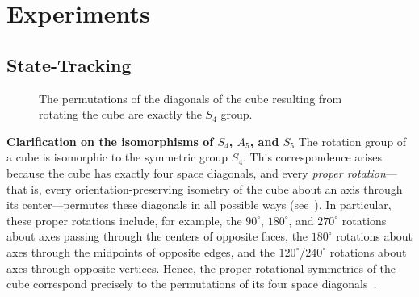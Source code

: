 \documentclass{article} %
\begin{document}
\section{Experiments}


\subsection{State-Tracking}\label{app:state_tracking}

\begin{wrapfigure}[15]{r}{0.2\linewidth}
\vspace{0mm}
  \centering
  \vspace{-7 mm}
  \caption{The permutations of the diagonals of the cube resulting from rotating the cube are exactly the $S_4$ group.}
  \label{fig:cube}
\end{wrapfigure}
\textbf{Clarification on the isomorphisms of $S_4$, $A_5$, and $S_5$}
The rotation group of a cube is isomorphic to the symmetric group $S_4$. This correspondence arises because the cube has exactly four space diagonals, and every \textit{proper rotation}---that is, every orientation-preserving isometry of the cube about an axis through its center---permutes these diagonals in all possible ways (see~). In particular, these proper rotations include, for example, the $90^\circ$, $180^\circ$, and $270^\circ$ rotations about axes passing through the centers of opposite faces, the $180^\circ$ rotations about axes through the midpoints of opposite edges, and the $120^\circ$/$240^\circ$ rotations about axes through opposite vertices. Hence, the proper rotational symmetries of the cube correspond precisely to the permutations of its four space diagonals~\citep{gallian2021contemporary}.
\end{document}
